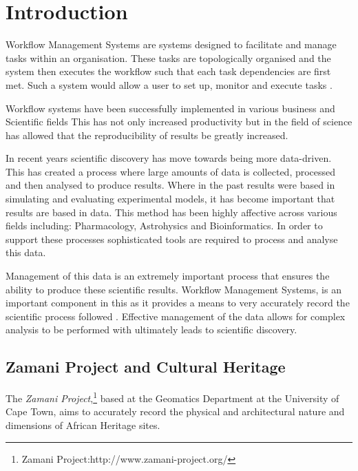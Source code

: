 
\chapter{Introduction}
    Workflow Management Systems are systems designed to facilitate and manage
    tasks within an organisation. These tasks are topologically organised and
    the system then executes the workflow
    such that each task dependencies are first met. Such a system would allow a user to
    set up, monitor and execute tasks \cite{slot2005workflow}.

    Workflow systems have been successfully implemented in various
    business and Scientific fields \cite{Brahe:2007:SWW:1316624.1316661}
    This has not only increased productivity but in the field of
    science has allowed that the reproducibility of results be greatly
    increased\cite{4721191}.

    In recent years scientific discovery has move towards being more data-driven\cite{gray2007escience}.
    This has created a process where large amounts of data is collected, processed 
    and then analysed to produce results. Where in the past results were based in simulating
    and evaluating experimental models, it has become important that results are based in 
    data. This method has been highly affective across various fields including: Pharmacology\cite{harpaz2012novel},
    Astrohysics\cite{thomas2011synapps} and Bioinformatics\cite{greene2010integrative}. 
    In order to support these processes sophisticated tools are required to process
    and analyse this data\cite{shneiderman2002inventing}. 

    Management of this data is an extremely important process that ensures the
    ability to produce these scientific results\cite{gray2005scientific}. Workflow 
    Management Systems, is an important component in this as it provides a means
    to very accurately record the scientific process followed  \cite{davidson2007provenance}.
    Effective management of the data allows for complex analysis to be performed
    with ultimately leads to scientific discovery\cite{ludascher2009scientific}.




\section{Zamani Project and Cultural Heritage}
    The \emph{Zamani Project},\footnote{Zamani Project:http://www.zamani-project.org/}
    based at the Geomatics Department at the University of Cape Town,
    aims to accurately record the physical and architectural nature
    and dimensions of African Heritage sites.

